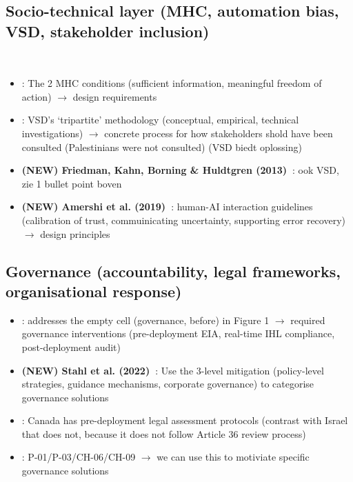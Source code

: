 \subsection{Socio-technical layer (MHC, automation bias, VSD, stakeholder inclusion)}\
\begin{itemize}
	\item \textbf{\citet{mhcof}}: The 2 MHC conditions (sufficient information, meaningful freedom of action) $\rightarrow$ design requirements
	\item \textbf{\citet{parasuraman2010complacency}}: VSD's `tripartite' methodology (conceptual, empirical, technical investigations) $\rightarrow$ concrete process for how stakeholders shold have been consulted (Palestinians were not consulted) (VSD biedt oplossing)
	\item \textbf{(NEW) Friedman, Kahn, Borning \& Huldtgren (2013)~\citep{friedman2013vsd}}: ook VSD, zie 1 bullet point boven
	\item \textbf{(NEW) Amershi et al. (2019)~\citep{amershi2019guidelines}}: human-AI interaction guidelines (calibration of trust, commuinicating uncertainty, supporting error recovery) $\rightarrow$ design principles
\end{itemize}


\subsection{Governance (accountability, legal frameworks, organisational response)}
\begin{itemize}
	\item \textbf{\citet{info12090385}}: addresses the empty cell (governance, before) in Figure 1 $\rightarrow$ required governance interventions (pre-deployment EIA, real-time IHL compliance, post-deployment audit)
	\item \textbf{(NEW) Stahl et al. (2022)~\citep{stahl2022organisational}}: Use the 3-level mitigation (policy-level strategies, guidance mechanisms, corporate governance) to categorise governance solutions
	\item \textbf{\citet{aimag.v40i1.2848}}: Canada has pre-deployment legal assessment protocols (contrast with Israel that does not, because it does not follow Article 36 review process)
	\item \textbf{\citet{khan2021ethicsaisystematicliterature}}: P-01/P-03/CH-06/CH-09 $\rightarrow$ we can use this to motiviate specific governance solutions
\end{itemize}
